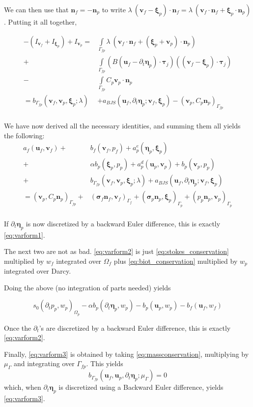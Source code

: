 \documentclass{article}
\newcommand{\mathspace}[1]{\ensuremath{#1}\xspace} %
\newcommand{\sigmabf}{\mathspace{\boldsymbol{\sigma}}}
\newcommand{\inner}[2]{\mathspace{\left (#1, #2 \right)}}
\newcommand{\ddt}[1]{\mathspace{\partial_t #1}}
\newcommand{\taubf}{\mathspace{\boldsymbol{\tau}}}
\newcommand{\stokes}{\mathspace{\Omega_{f}}}
\newcommand{\stokesbdy}{\mathspace{\Gamma_{f}}}
\newcommand{\darcy}{\mathspace{\Omega_{p}}}
\newcommand{\darcybdy}{\mathspace{\Gamma_{p}}}
\newcommand{\interface}{\mathspace{\Gamma_{fp}}}
\newcommand{\nf}{\mathspace{\mathbf{n}_f}}
\newcommand{\np}{\mathspace{\mathbf{n}_p}}
\newcommand{\intI}{\mathspace{\int \limits_{\interface}}}
\newcommand{\uf}{\mathspace{\mathbf{u}_f}}
\newcommand{\vf}{\mathspace{\mathbf{v}_f}}
\newcommand{\up}{\mathspace{\mathbf{u}_p}}
\newcommand{\vp}{\mathspace{\mathbf{v}_p}}
\newcommand{\pf}{\mathspace{p_f}}
\newcommand{\pp}{\mathspace{p_p}}
\newcommand{\wf}{\mathspace{w_f}}
\renewcommand{\wp}{\mathspace{w_p}}
\newcommand{\disp}{\mathspace{\boldsymbol{\eta}_p}}
\newcommand{\disptest}{\mathspace{\boldsymbol{\xi}_p}}
\newcommand{\multtest}{\mathspace{\mu_{\Gamma}}}
\begin{document}
We can then use that $\nf = - \np$ to write $\lambda \: (\vf - \disptest) \cdot \nf = \lambda \: (\vf  \cdot \nf + \disptest \cdot \np)$.
Putting it all together,

\begin{align*}
  -(I_{\vf} + I_{\disptest}) + I_{\vp}  =& \intI \lambda\: (\vf  \cdot \nf + (\disptest + \vp) \cdot \np) \\
  + &\intI \left (B \left ( \uf - \ddt{\disp} \right ) \cdot \taubf_j \right ) ((\vf - \disptest) \cdot \taubf_j) \\
  - &\intI C_p \vp \cdot \np \\
  = b_{\interface}\left (\vf, \vp, \disptest; \lambda \right ) & + a_{BJS}\left (\uf, \ddt{\disp}; \vf, \disptest \right) - \inner{\vp}{C_p\np}_{\interface} \\
\end{align*}

We have now derived all the necessary identities, and summing them all yields the following:
\begin{align*}
  a_f(\uf, \vf) +& b_f(\vf, \pf)  + a^e_p(\disp, \disptest)  \\ +&\alpha b_p(\disptest, \pp)  + a_p^d(\up, \vp) + b_p(\vp, \pp)  \\
  + &b_{\interface}\left (\vf, \vp, \disptest; \lambda \right ) + a_{BJS}\left (\uf, \ddt{\disp}; \vf, \disptest \right)\\
      = \inner{\vp}{C_p\np}_{\interface} +& (\sigmabf_f\nf, \vf)_{\stokesbdy} + (\sigmabf_p\np, \disptest)_{\darcybdy} + (\pp\np, \vp)_{\darcybdy}\\
\end{align*}

If \ddt{\disp} is now discretized by a backward Euler difference, this is exactly \eqref{eq:varform1}.

The next two are not as bad. \eqref{eq:varform2} is just \eqref{eq:stokes_conservation} multiplied by \wf integrated over \stokes plus \eqref{eq:biot_conservation} multiplied by \wp integrated over Darcy.

Doing the above (no integration of parts needed) yields

$$s_0\inner{\ddt{\pp}}{\wp}_{\darcy} - \alpha b_p(\ddt{\disp}, \wp)
- b_p(\up, \wp) - b_f(\uf, \wf)$$ 

Once the \ddt{}'s are discretized by a backward Euler difference, this is exactly \eqref{eq:varform2}.

Finally, \eqref{eq:varform3} is obtained by taking \eqref{eq:massconservation}, multiplying by \multtest and integrating over \interface. This yields $$b_{\interface} (\uf, \up, \ddt{\disp} ;\multtest) = 0$$
which, when \ddt{\disp} is discretized using a Backward Euler difference, yields \eqref{eq:varform3}.
\end{document}
